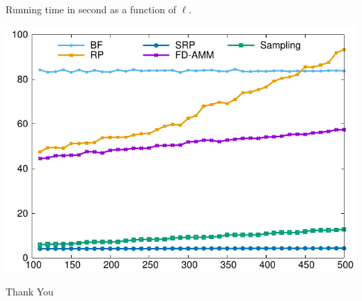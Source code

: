 \documentclass{beamer}
\begin{document}
\begin{frame}
	Running time in second as a function of $\ell$. 
		\begin{center}
			\includegraphics*[scale=0.8]{figures/time.pdf} 
		\end{center}
\end{frame}

\begin{frame} 
	\begin{center}
		\large {Thank You}
	\end{center}
	
\end{frame}
\end{document}
